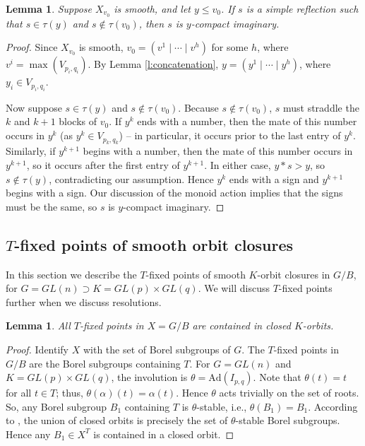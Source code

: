 \documentclass[11pt,letterpaper,reqno]{amsart}
\numberwithin{equation}{section}
\theoremstyle{plain}
\newtheorem{lemma}[theorem]{Lemma}
\theoremstyle{definition}
\theoremstyle{remark}
\newcommand{\Ad}{\mathrm{Ad}}
\begin{document}
\begin{lemma} \label{l:compact-im}
Suppose $X_{v_0}$ is smooth, and let $y \leq v_0$.   If $s$ is a simple reflection such that $s \in \tau(y)$ and $s \not\in \tau(v_0)$, then
$s$ is $y$-compact imaginary.
\end{lemma}
\begin{proof}
Since $X_{v_0}$ is smooth, $v_0=(v^1 \mid \cdots \mid v^h)$ for some $h$, where $v^i = \max(V_{p_i, q_i})$. 
By Lemma \ref{l:concatenation},
$y = (y^1 \mid \cdots \mid y^h)$, where $y_i \in V_{p_i, q_i}$.  

Now suppose $s \in \tau(y)$ and $s \not\in \tau(v_0)$.  Because $s \not\in \tau(v_0)$, $s$ must straddle the $k$ and $k+1$ blocks of $v_0$.  If $y^k$ ends with a number, then the mate of this number occurs in $y^k$ (as $y^k \in V_{p_k, q_k}$) -- in particular, it occurs prior to the last entry of $y^k$.  Similarly, if $y^{k+1}$ begins with a number, then the mate of this number occurs in $y^{k+1}$, so it occurs after the first entry of $y^{k+1}$.  In either case, $y * s > y$, so $s \not\in \tau(y)$, contradicting our assumption.  Hence $y^k$ ends with a sign and $y^{k+1}$ begins with a sign.  Our discussion of the monoid action implies that the signs must be the same, so $s$ is $y$-compact imaginary.
\end{proof}

\subsection{$T$-fixed points of smooth orbit closures} \label{ss:T-fixed}
In this section we describe the $T$-fixed points of smooth $K$-orbit closures in $G/B$, for
$G = GL(n) \supset K = GL(p) \times GL(q)$.  We will discuss $T$-fixed points further when we discuss resolutions.

\begin{lemma}\label{lem6.3}
All $T$-fixed points in $X = G/B$ are contained in closed $K$-orbits.
\end{lemma}
\begin{proof}
Identify $X$ with the set of Borel subgroups of $G$.
The $T$-fixed points in $G/B$ are the Borel subgroups containing $T$.   For $G = GL(n)$ and $K = GL(p) \times GL(q)$, 
the involution is $\theta=\Ad(I_{p,q})$.  Note that  
$\theta(t)=t$ for all $t\in T$; thus, $\theta(\alpha)(t)=\alpha(t)$.  Hence $\theta$ acts trivially on the set of roots. So, any Borel subgroup $B_1$ 
containing $T$ is $\theta$-stable, i.e., $\theta(B_1)=B_1$.   
According to \cite[Lemma 5.8]{Milicic}, the union of closed orbits is precisely the set of $\theta$-stable Borel subgroups.  Hence any $B_1 \in X^T$
is contained in a closed orbit.
\end{proof}
\end{document}
